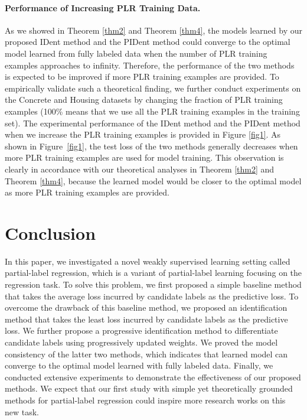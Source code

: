 \documentclass[letterpaper]{article} %
\begin{document}
\paragraph{Performance of Increasing PLR Training Data.} As we showed in Theorem \ref{thm2} and Theorem \ref{thm4}, the models learned by our proposed IDent method and the PIDent method could converge to the optimal model learned from fully labeled data when the number of PLR training examples approaches to infinity. Therefore, the performance of the two methods is expected to be improved if more PLR training examples are provided. To empirically validate such a theoretical finding, we further conduct experiments on the Concrete and Housing datasets by changing the fraction of PLR training examples (100\% means that we use all the PLR training examples in the training set). The experimental performance of the IDent method and the PIDent method when we increase the PLR training examples is provided in Figure \ref{fig1}. As shown in Figure~\ref{fig1}, the test loss of the two methods generally decreases when more PLR training examples are used for model training. This observation is clearly in accordance with our theoretical analyses in Theorem \ref{thm2} and Theorem \ref{thm4}, because the learned model would be closer to the optimal model as more PLR training examples are provided.
\section{Conclusion}
In this paper, we investigated a novel weakly supervised learning setting called partial-label regression, which is a variant of partial-label learning focusing on the regression task.
To solve this problem, we first proposed a simple baseline method that takes the average loss incurred by candidate labels as the predictive loss. To overcome the drawback of this baseline method, we proposed an identification method that takes the least loss incurred by candidate labels as the predictive loss. We further propose a progressive identification method to differentiate candidate labels using progressively updated weights. We proved the model consistency of the latter two methods, which indicates that learned model can converge to the optimal model learned with fully labeled data. Finally, we conducted extensive experiments to demonstrate the effectiveness of our proposed methods. We expect that our first study with simple yet theoretically grounded methods for partial-label regression could inspire more research works on this new task.
\end{document}
